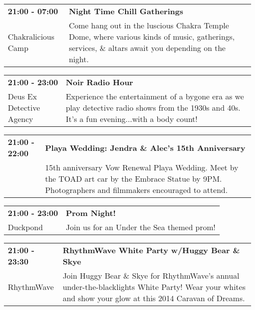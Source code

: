 \begin{tabular}{ p{1in} p{2.2in} }
    \textbf{21:00 - 07:00} & \textbf{Night Time Chill Gatherings} \\
    Chakralicious Camp \newline  & Come hang out in the luscious Chakra Temple Dome, where various kinds of music, gatherings, services, \& altars await you depending on the night. \\
    \hline 
\end{tabular}
    
\begin{tabular}{ p{1in} p{2.2in} }
    \textbf{21:00 - 23:00} & \textbf{Noir Radio Hour} \\
    Deus Ex Detective Agency \newline  & Experience the entertainment of a bygone era as we play detective radio shows from the 1930s and 40s. It's a fun evening...with a body count! \\
    \hline 
\end{tabular}
    
\begin{tabular}{ p{1in} p{2.2in} }
    \textbf{21:00 - 22:00} & \textbf{Playa Wedding: Jendra \& Alec's 15th Anniversary} \\
    ~ \newline  & 15th anniversary Vow Renewal Playa Wedding. Meet by the TOAD art car by the Embrace Statue by 9PM. Photographers and filmmakers encouraged to attend. \\
    \hline 
\end{tabular}
    
\begin{tabular}{ p{1in} p{2.2in} }
    \textbf{21:00 - 23:00} & \textbf{Prom Night!} \\
    Duckpond \newline  & Join us for an Under the Sea themed prom! \\
    \hline 
\end{tabular}
    
\begin{tabular}{ p{1in} p{2.2in} }
    \textbf{21:00 - 23:30} & \textbf{RhythmWave White Party w/Huggy Bear \& Skye} \\
    RhythmWave \newline  & Join Huggy Bear \& Skye for RhythmWave's annual under-the-blacklights White Party! Wear your whites and show your glow at this 2014 Caravan of Dreams. \\
    \hline 
\end{tabular}
    

